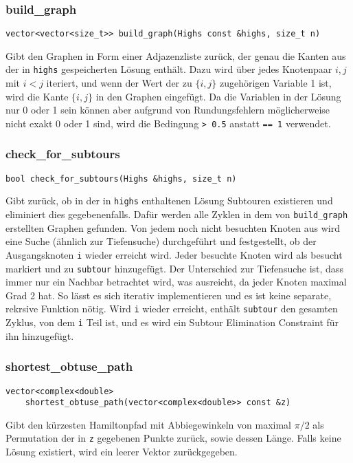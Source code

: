 \documentclass[a4paper, 10pt, ngerman]{article}
\begin{document}
\subsubsection{build\_graph}
\verb|vector<vector<size_t>> build_graph(Highs const &highs, size_t n)|
\medskip

\noindent Gibt den Graphen in Form einer Adjazenzliste zurück, der genau die Kanten aus der in \verb|highs| gespeicherten Lösung enthält. Dazu wird über jedes Knotenpaar $i, j$ mit $i < j$ iteriert, und wenn der Wert der zu $\{i, j\}$ zugehörigen Variable 1 ist, wird die Kante $\{i, j\}$ in den Graphen eingefügt. Da die Variablen in der Lösung nur 0 oder 1 sein können aber aufgrund von Rundungsfehlern möglicherweise nicht exakt 0 oder 1 sind, wird die Bedingung \verb|> 0.5| anstatt \verb|== 1| verwendet.

\subsubsection{check\_for\_subtours}
\verb|bool check_for_subtours(Highs &highs, size_t n)|
\medskip

\noindent Gibt zurück, ob in der in \verb|highs| enthaltenen Lösung Subtouren existieren und eliminiert dies gegebenenfalls. Dafür werden alle Zyklen in dem von \verb|build_graph| erstellten Graphen gefunden. Von jedem noch nicht besuchten Knoten aus wird eine Suche (ähnlich zur Tiefensuche) durchgeführt und festgestellt, ob der Ausgangsknoten \verb|i| wieder erreicht wird. Jeder besuchte Knoten wird als besucht markiert und zu \verb|subtour| hinzugefügt. Der Unterschied zur Tiefensuche ist, dass immer nur ein Nachbar betrachtet wird, was ausreicht, da jeder Knoten maximal Grad 2 hat. So lässt es sich iterativ implementieren und es ist keine separate, rekrsive Funktion nötig. Wird \verb|i| wieder erreicht, enthält \verb|subtour| den gesamten Zyklus, von dem \verb|i| Teil ist, und es wird ein Subtour Elimination Constraint für ihn hinzugefügt.

\subsubsection{shortest\_obtuse\_path}

\verb|vector<complex<double>| \\
\verb|    shortest_obtuse_path(vector<complex<double>> const &z)|
\medskip

\noindent Gibt den kürzesten Hamiltonpfad mit Abbiegewinkeln von maximal $\pi / 2$ als Permutation der in \verb|z| gegebenen Punkte zurück, sowie dessen Länge. Falls keine Lösung existiert, wird ein leerer Vektor zurückgegeben.
\end{document}
